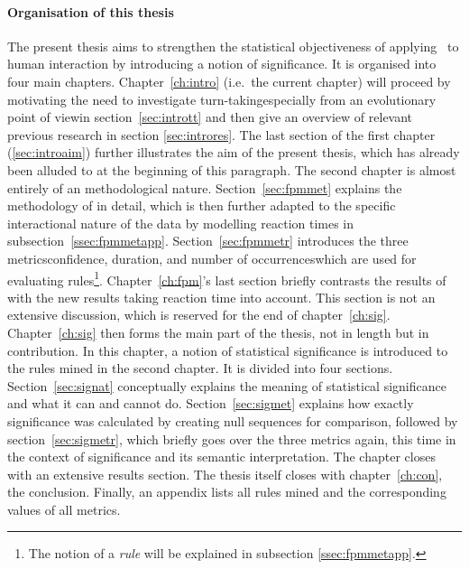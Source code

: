 \paragraph{Organisation of this thesis}
The present thesis aims to strengthen the statistical objectiveness of applying \fpmlower\ to human interaction by introducing a notion of significance.
It is organised into four main chapters.
Chapter~\ref{ch:intro} (i.e.\ the current chapter) will proceed by motivating the need to investigate turn-taking\dash especially from an evolutionary point of view\dash in section~\ref{sec:intrott} and then give an overview of relevant previous research in section \ref{sec:introres}.
The last section of the first chapter (\ref{sec:introaim}) further illustrates the aim of the present thesis, which has already been alluded to at the beginning of this paragraph.
The second chapter is almost entirely of an methodological nature.
Section~\ref{sec:fpmmet} explains the methodology of \citet{rohlfing_multimodal_underreview} in detail, which is then further adapted to the specific interactional nature of the data by modelling reaction times in subsection~\ref{ssec:fpmmetapp}.
Section~\ref{sec:fpmmetr} introduces the three metrics\dash confidence, duration, and number of occurrences\dash which are used for evaluating rules\footnote{The notion of a \emph{rule} will be explained in subsection \ref{ssec:fpmmetapp}.}.
Chapter~\ref{ch:fpm}'s last section briefly contrasts the results of \citet{rohlfing_multimodal_underreview} with the new results taking reaction time into account.
This section is not an extensive discussion, which is reserved for the end of chapter~\ref{ch:sig}.
Chapter~\ref{ch:sig} then forms the main part of the thesis, not in length but in contribution.
In this chapter, a notion of statistical significance is introduced to the rules mined in the second chapter.
It is divided into four sections.
Section~\ref{sec:signat} conceptually explains the meaning of statistical significance and what it can and cannot do.
Section~\ref{sec:sigmet} explains how exactly significance was calculated by creating null sequences for comparison, followed by section~\ref{sec:sigmetr}, which briefly goes over the three metrics again, this time in the context of significance and its semantic interpretation.
The chapter closes with an extensive results section.
The thesis itself closes with chapter~\ref{ch:con}, the conclusion.
Finally, an appendix lists all rules mined and the corresponding values of all metrics.


